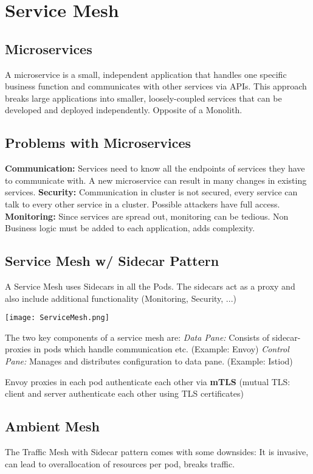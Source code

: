 \section{Service Mesh}
\subsection{Microservices}
A microservice is a small, independent application that handles one specific business function and communicates with other services via APIs. This approach breaks large applications into smaller, loosely-coupled services that can be developed and deployed independently. Opposite of a Monolith.
\subsection{Problems with Microservices}
\textbf{Communication:} Services need to know all the endpoints of services they have to communicate with. A new microservice can result in many changes in existing services.
\textbf{Security:} Communication in cluster is not secured, every service can talk to every other service in a cluster. Possible attackers have full access.
\textbf{Monitoring:} Since services are spread out, monitoring can be tedious. Non Business logic must be added to each application, adds complexity.
\subsection{Service Mesh w/ Sidecar Pattern}
A Service Mesh uses Sidecars in all the Pods. The sidecars act as a proxy and also include additional functionality (Monitoring, Security, ...)


\texttt{[image: ServiceMesh.png]}

The two key components of a service mesh are:
\textit{Data Pane:} Consists of sidecar-proxies in pods which handle communication etc. (Example: Envoy)
\textit{Control Pane:} Manages and distributes configuration to data pane. (Example: Istiod)

Envoy proxies in each pod authenticate each other via \textbf{mTLS} (mutual TLS: client and server authenticate each other using TLS certificates)

\subsection{Ambient Mesh}
The Traffic Mesh with Sidecar pattern comes with some downsides: It is invasive, can lead to overallocation of resources per pod, breaks traffic.


